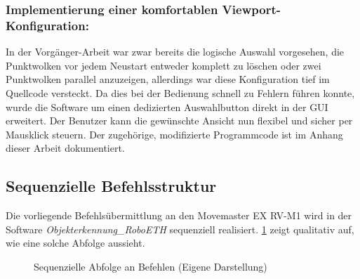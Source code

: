\subsubsection*{Implementierung einer komfortablen Viewport-Konfiguration:} In der Vorgänger-Arbeit war zwar bereits die logische Auswahl vorgesehen, die Punktwolken vor jedem Neustart entweder komplett zu löschen oder zwei Punktwolken parallel anzuzeigen, allerdings war diese Konfiguration tief im Quellcode versteckt. Da dies bei der Bedienung schnell zu Fehlern führen konnte, wurde die Software um einen dedizierten Auswahlbutton direkt in der GUI erweitert. Der Benutzer kann die gewünschte Ansicht nun flexibel und sicher per Mausklick steuern. Der zugehörige, modifizierte Programmcode ist im Anhang dieser Arbeit dokumentiert.

\subsection{Sequenzielle Befehlsstruktur}
\label{kap:Sequenzielle Befehelsstruktur}
Die vorliegende Befehlsübermittlung an den Movemaster EX RV-M1 wird in der Software \textit{Objekterkennung\_RoboETH} sequenziell realisiert. \ref{fig:sequenzielle Abfolge an Befehlen} zeigt qualitativ auf, wie eine solche Abfolge aussieht.
\begin{figure}[h!]
	\centering
	\caption{Sequenzielle Abfolge an Befehlen (Eigene Darstellung)}
	\label{fig:sequenzielle Abfolge an Befehlen}
\end{figure}
